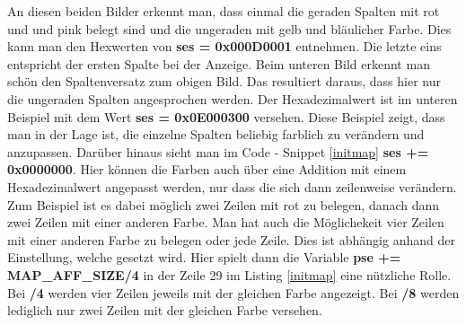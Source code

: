 An diesen beiden Bilder erkennt man, dass einmal die geraden Spalten mit rot und und pink belegt sind und die ungeraden mit gelb und bläulicher Farbe. Dies kann man den Hexwerten von \textbf{ses = 0x000D0001} entnehmen. Die letzte eins entspricht der ersten Spalte bei der Anzeige. Beim unteren Bild erkennt man schön den Spaltenversatz zum obigen Bild. Das resultiert daraus, dass hier nur die ungeraden Spalten angesprochen werden. Der Hexadezimalwert ist im unteren Beispiel mit dem Wert \textbf{ses = 0x0E000300} versehen. Diese Beispiel zeigt, dass man in der Lage ist, die einzelne Spalten beliebig farblich zu verändern und anzupassen. Darüber hinaus sieht man im Code - Snippet \ref{initmap} \textbf{ses += 0x0000000}. Hier können die Farben auch über eine Addition mit einem Hexadezimalwert angepasst werden, nur dass die sich dann zeilenweise verändern. Zum Beispiel ist es dabei möglich zwei Zeilen mit rot zu belegen, danach dann zwei Zeilen mit einer anderen Farbe. Man hat auch die Möglichekeit vier Zeilen mit einer anderen Farbe zu belegen oder jede Zeile. Dies ist abhängig anhand der Einstellung, welche gesetzt wird. Hier spielt dann die Variable \textbf{pse += MAP\_AFF\_SIZE/4} in der Zeile 29 im Listing \ref{initmap} eine nützliche Rolle. Bei \textbf{/4} werden vier Zeilen jeweils mit der gleichen Farbe angezeigt. Bei \textbf{/8} werden lediglich nur zwei Zeilen mit der gleichen Farbe versehen.



